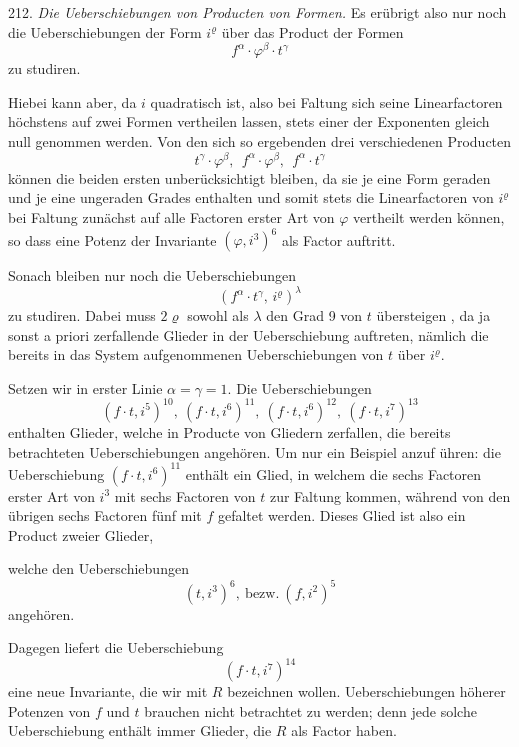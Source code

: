 212. \textit{Die Ueberschiebungen von Producten von Formen.} Es er\"ubrigt
also nur noch die Ueberschiebungen der Form $i^\varrho$ \"uber das Product
der Formen
\[
f^\alpha \cdot \varphi^\beta \cdot t^\gamma
\]
zu studiren.

Hiebei kann aber, da $i$ quadratisch ist, also bei Faltung sich
seine Linearfactoren h\"ochstens auf zwei Formen vertheilen lassen,
stets einer der Exponenten gleich null genommen werden. Von den
sich so ergebenden drei verschiedenen Producten
\[
t^\gamma \cdot \varphi^\beta,\ \ f^\alpha \cdot \varphi^\beta,\ \ f^\alpha \cdot t^\gamma
\]
k\"onnen die beiden ersten unber\"ucksichtigt bleiben, da sie je eine Form
geraden und je eine ungeraden Grades enthalten und somit stets die
Linearfactoren von $i^\varrho$ bei Faltung zun\"achst auf alle Factoren erster
Art von $\varphi$ vertheilt werden k\"onnen, so dass eine Potenz der Invariante
$(\varphi, i^3)^6$ als Factor auftritt.

Sonach bleiben nur noch die Ueberschiebungen
\[
(f^\alpha \cdot t^\gamma,\, i^\varrho)^\lambda
\]
zu studiren. Dabei muss $2\varrho$ sowohl als $\lambda$ den Grad 9 von $t$ \"ubersteigen
, da ja sonst a priori zerfallende Glieder in der Ueberschiebung
auftreten, n\"amlich die bereits in das System aufgenommenen Ueberschiebungen
 von $t$ \"uber $i^\varrho$.

Setzen wir in erster Linie $\alpha = \gamma = 1$. Die Ueberschiebungen
\[
(f \cdot t, i^5)^{10},\ (f \cdot t, i^6)^{11},\ (f \cdot t, i^6)^{12},\ (f \cdot t, i^7)^{13}
\]
enthalten Glieder, welche in Producte von Gliedern zerfallen, die bereits
betrachteten Ueberschiebungen angeh\"oren. Um nur ein Beispiel anzuf
\"uhren: die Ueberschiebung $(f \cdot t, i^6)^{11}$ enth\"alt ein Glied, in welchem
die sechs Factoren erster Art von $i^3$ mit sechs Factoren von $t$ zur
Faltung kommen, w\"ahrend von den \"ubrigen sechs Factoren f\"unf mit
$f$ gefaltet werden. Dieses Glied ist also ein Product zweier Glieder,


welche den Ueberschiebungen
\[
(t, i^3)^6,\ \text{bezw.}\ (f, i^2)^5
\]
angeh\"oren.

Dagegen liefert die Ueberschiebung
\[
(f \cdot t, i^7)^{14}
\]
eine neue Invariante, die wir mit $R$ bezeichnen wollen. Ueberschiebungen
 h\"oherer Potenzen von $f$ und $t$ brauchen nicht betrachtet
zu werden; denn jede solche Ueberschiebung enth\"alt immer Glieder,
die $R$ als Factor haben.

